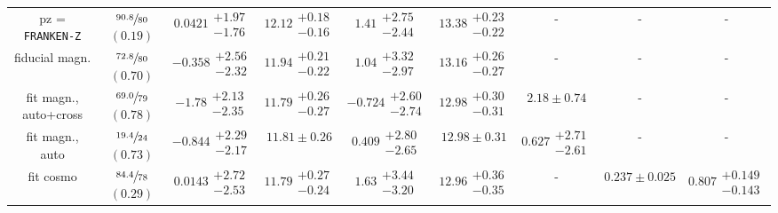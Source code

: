 \documentclass[a4paper,11pt]{article}
\begin{document}
\begin{table}
\begin{center}
\begin{tabular}{ccccccccc}
            pz = \texttt{FRANKEN-Z} & $\sfrac{90.8}{80}$ $(0.19)$ & $0.0421\substack{+1.97 \\ -1.76}$ & $12.12\substack{+0.18 \\ -0.16}$ & $1.41\substack{+2.75 \\ -2.44}$ & $13.38\substack{+0.23 \\ -0.22}$ & - & - & - \\
            fiducial magn. & $\sfrac{72.8}{80}$ $(0.70)$ & $-0.358\substack{+2.56 \\ -2.32}$ & $11.94\substack{+0.21 \\ -0.22}$ & $1.04\substack{+3.32 \\ -2.97}$ & $13.16\substack{+0.26 \\ -0.27}$  & - & - & - \\
            fit magn., auto+cross & $\sfrac{69.0}{79}$ $(0.78)$ & $-1.78\substack{+2.13 \\ -2.35}$ & $11.79\substack{+0.26 \\ -0.27}$ & $-0.724\substack{+2.60 \\ -2.74}$ & $12.98\substack{+0.30 \\ -0.31}$  & $2.18 \pm 0.74$ & - & - \\
            fit magn., auto & $\sfrac{19.4}{24}$ $(0.73)$ & $-0.844\substack{+2.29 \\ -2.17}$ & $11.81 \pm 0.26$ & $0.409\substack{+2.80 \\ -2.65}$ & $12.98 \pm 0.31$  & $0.627\substack{+2.71 \\ -2.61}$ & - & - \\
            fit cosmo & $\sfrac{84.4}{78}$ $(0.29)$ & $0.0143\substack{+2.72 \\ -2.53}$ & $11.79\substack{+0.27 \\ -0.24}$ & $1.63\substack{+3.44 \\ -3.20}$ & $12.96\substack{+0.36 \\ -0.35}$  & - & $0.237 \pm 0.025$ & $0.807\substack{+0.149 \\ -0.143}$ \\
            \hline \hline
          \end{tabular}
        \end{center}
      \end{table}
      
\end{document}
